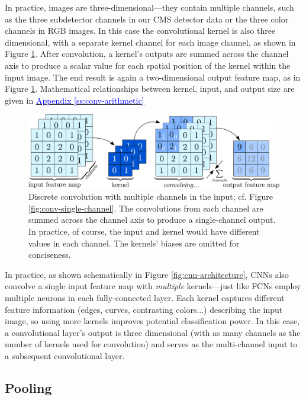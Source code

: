 \documentclass[11pt, a4paper]{article}
\newcommand{\myhref}[2]{\hyperref[#1]{\textcolor{blue}{#2}}}
\begin{document}
In practice, images are three-dimensional---they contain multiple channels, such as the three subdetector channels in our CMS detector data or the three color channels in RGB images.
In this case the convolutional kernel is also three dimensional, with a separate kernel channel for each image channel, as shown in Figure \ref{fig:conv-multi-channel}.
After convolution, a kernel's outputs are summed across the channel axis to produce a scalar value for each spatial position of the kernel within the input image.
The end result is again a two-dimensional output feature map, as in Figure \ref{fig:conv-multi-channel}.
Mathematical relationships between kernel, input, and output size are given in \myhref{ss:conv-arithmetic}{Appendix \ref{ss:conv-arithmetic}}

\begin{figure}[htb!]
    \centering
    \includegraphics[width=0.9\linewidth]{vector/conv-multi-channel.pdf}
    \caption{Discrete convolution with multiple channels in the input; cf. Figure \ref{fig:conv-single-channel}.
    The convolutions from each channel are summed across the channel axis to produce a single-channel output.
    In practice, of course, the input and kernel would have different values in each channel.
    The kernels' biases are omitted for conciseness.}
    \label{fig:conv-multi-channel}
\end{figure}

In practice, as shown schematically in Figure \ref{fig:cnn-architecture}, CNNs also convolve a single input feature map with \textit{multiple} kernels---just like FCNs employ multiple neurons in each fully-connected layer.
Each kernel captures different feature information (edges, curves, contrasting colors...) describing the input image, so using more kernels improves potential classification power.
In this case, a convolutional layer's output is three dimensional (with as many channels as the number of kernels used for convolution) and serves as the multi-channel input to a subsequent convolutional layer.

\subsection{Pooling}
\end{document}
